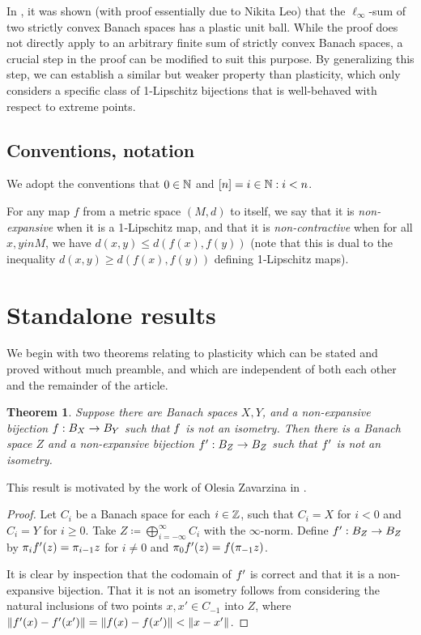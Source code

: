\documentclass{amsart}
\newtheorem{theorem}{Theorem}
\theoremstyle{definition}
\begin{document}
In \cite{haller:2022}, it was shown (with proof essentially due to Nikita Leo)
that the $\ell_\infty$-sum of two strictly
convex Banach spaces has a plastic unit ball. While the proof does not directly apply to an arbitrary finite sum of strictly convex Banach spaces, a crucial step in the proof can be modified to suit this purpose. By generalizing this step, we can establish a similar but weaker property than plasticity, which only considers a specific class of
1-Lipschitz bijections that is well-behaved with respect to extreme points.

\subsection{Conventions, notation}

We adopt the conventions that $0 \in \mathbb{N}$ and $[n] = {i \in \mathbb{N} : i < n}$.

For any map $f$ from a metric space $(M,d)$ to itself,
we say that it is \textit{non-expansive} when it is a 1‑Lipschitz
map, and that it is \textit{non-contractive} when for all
$x, y in M$, we have $d(x,y) \leq d(f(x), f(y))$ (note
that this is dual to the inequality $d(x,y) \geq d(f(x), f(y))$ defining
1‑Lipschitz maps).

\section{Standalone results}

We begin with two theorems relating to plasticity which can be stated and proved without much preamble, and which are independent of both each other and the remainder of the article.


\begin{theorem}
    Suppose there are Banach spaces $X, Y$, and a non-expansive bijection $f : B_X \to B_Y$ such that $f$ is not an isometry. Then there is a Banach space $Z$ and a non-expansive bijection $f' : B_Z \to B_Z$ such that $f'$ is not an isometry.
\end{theorem}

This result is motivated by the work of Olesia Zavarzina in \cite{zavarzina:2017}.

\begin{proof}
    Let $C_i$ be a Banach space for each $i \in \mathbb{Z}$, such that $C_i = X$
    for $i < 0$ and $C_i = Y$ for $i \geq 0$. Take $Z \coloneqq \bigoplus_{i=-\infty}^\infty C_i$ with the $\infty$-norm. Define $f' : B_Z \to B_Z$ by $\pi_i f'(z) = \pi_{i-1} z$ for $i \neq 0$ and $\pi_0 f'(z) = f(\pi_{-1}z)$.
  
    It is clear by inspection that the codomain of $f'$ is correct and that it is a non-expansive bijection. That it is not an isometry follows from considering the natural inclusions of two points $x, x' \in C_{-1}$ into $Z$, where $\norm{f'(x) - f'(x')} = \norm{f(x)-f(x')} < \norm{x-x'}$.
\end{proof}
\end{document}
